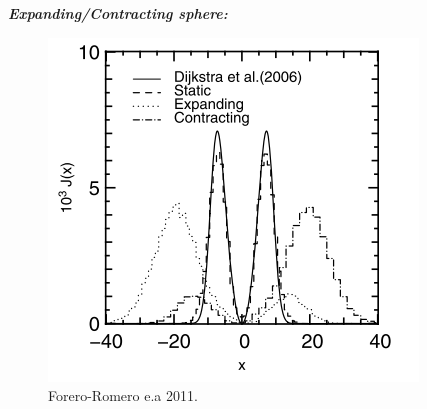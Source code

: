 \documentclass{beamer}
\begin{document}
\begin{frame}{\textit{\textbf{Expanding/Contracting sphere:}}}
\begin{figure}
\includegraphics[scale=0.5]{Figures/expanding.png}
\caption*{Forero-Romero e.a 2011.}
\end{figure}
\end{frame}

\end{document}
